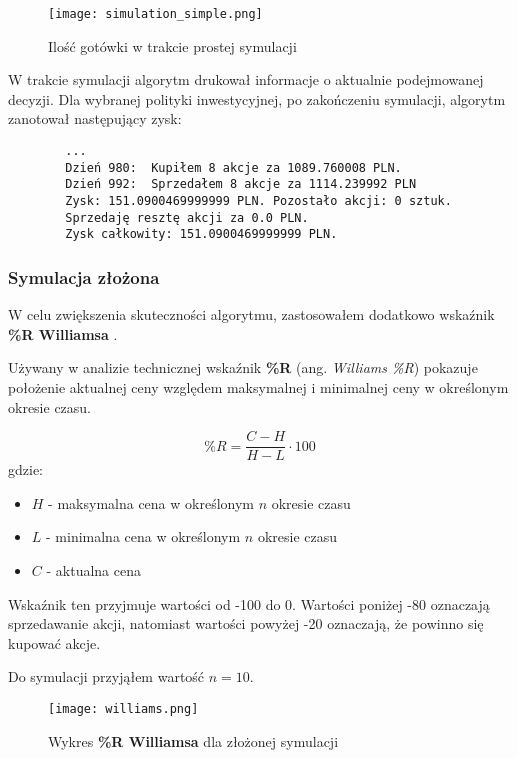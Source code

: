 \documentclass{article}
\begin{document}
    \begin{figure}[H]
        \texttt{[image: simulation\_simple.png]}
        \centering
        \caption{Ilość gotówki w trakcie prostej symulacji}
    \end{figure}

    W trakcie symulacji algorytm drukował informacje o aktualnie podejmowanej decyzji.
    Dla wybranej polityki inwestycyjnej, po zakończeniu symulacji, algorytm zanotował następujący zysk:
    \begin{verbatim}
        ...
        Dzień 980:  Kupiłem 8 akcje za 1089.760008 PLN.
        Dzień 992:  Sprzedałem 8 akcje za 1114.239992 PLN
        Zysk: 151.0900469999999 PLN. Pozostało akcji: 0 sztuk.
        Sprzedaję resztę akcji za 0.0 PLN.
        Zysk całkowity: 151.0900469999999 PLN.
    \end{verbatim}

    \subsubsection{Symulacja złożona}

    W celu zwiększenia skuteczności algorytmu, zastosowałem dodatkowo wskaźnik \textbf{\%R Williamsa} \cite{wiki1}\cite{williams}.

    Używany w analizie technicznej wskaźnik \textbf{\%R} (ang. \textit{Williams \%R})
    pokazuje położenie aktualnej ceny względem maksymalnej i minimalnej ceny w określonym okresie czasu.

    \begin{equation}
        \%R = \frac{C - H}{H - L} \cdot 100
    \end{equation}
    gdzie:
    \begin{itemize}
        \item $H$ - maksymalna cena w określonym $n$ okresie czasu
        \item $L$ - minimalna cena w określonym $n$ okresie czasu
        \item $C$ - aktualna cena
    \end{itemize}

    Wskaźnik ten przyjmuje wartości od -100 do 0.
    Wartości poniżej -80 oznaczają sprzedawanie akcji,
    natomiast wartości powyżej -20 oznaczają, że powinno się kupować akcje.

    Do symulacji przyjąłem wartość $n = 10$.

    \begin{figure}[H]
        \texttt{[image: williams.png]}
        \centering
        \caption{Wykres \textbf{\%R Williamsa} dla złożonej symulacji}
    \end{figure}
\end{document}
